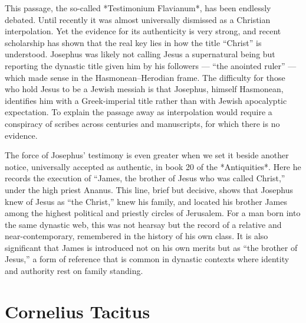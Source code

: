 This passage, the so-called *Testimonium Flavianum*, has been endlessly debated.
Until recently it was almost universally dismissed as a Christian interpolation.
Yet the evidence for its authenticity is very strong, and recent scholarship has shown that the real key lies in how the title “Christ” is understood.
Josephus was likely not calling Jesus a supernatural being but reporting the dynastic title given him by his followers — “the anointed ruler” — which made sense in the Hasmonean–Herodian frame.
The difficulty for those who hold Jesus to be a Jewish messiah is that Josephus, himself Hasmonean, identifies him with a Greek-imperial title rather than with Jewish apocalyptic expectation.
To explain the passage away as interpolation would require a conspiracy of scribes across centuries and manuscripts, for which there is no evidence.

The force of Josephus’ testimony is even greater when we set it beside another notice, universally accepted as authentic, in book 20 of the *Antiquities*.
Here he records the execution of “James, the brother of Jesus who was called Christ,” under the high priest Ananus.
This line, brief but decisive, shows that Josephus knew of Jesus as “the Christ,” knew his family, and located his brother James among the highest political and priestly circles of Jerusalem.
For a man born into the same dynastic web, this was not hearsay but the record of a relative and near-contemporary, remembered in the history of his own class.
It is also significant that James is introduced not on his own merits but as “the brother of Jesus,” a form of reference that is common in dynastic contexts where identity and authority rest on family standing.

\section{Cornelius Tacitus}\label{sec:cornelius-tacitus}

